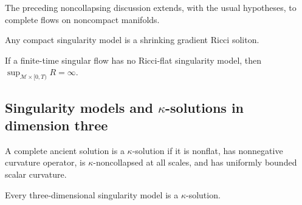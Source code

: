\begin{remark}
\label{rem:chow-iv-noncompact-extension}

The preceding noncollapsing discussion extends, with the usual hypotheses,
to complete flows on noncompact manifolds.
\end{remark}

\begin{theorem}
\label{thm:chow-iv-compact-singularity-models}

Any compact singularity model is a shrinking gradient Ricci soliton.
\end{theorem}

\begin{lemma}
\label{lem:chow-iv-bounded-scalar-criterion}

If a finite-time singular flow has no Ricci-flat singularity model, then
\(\sup_{\mathcal M\times[0,T)}R=\infty\).
\end{lemma}

\subsection{\texorpdfstring{Singularity models and \(\kappa\)-solutions in dimension three}{Singularity models and Kappa-solutions in dimension three}}

\begin{definition}
\label{def:chow-iv-kappa-solution}

A complete ancient solution is a \(\kappa\)-solution if it is nonflat, has
nonnegative curvature operator, is \(\kappa\)-noncollapsed at all scales, and
has uniformly bounded scalar curvature.
\end{definition}

\begin{theorem}
\label{thm:chow-iv-3d-models-kappa}


Every three-dimensional singularity model is a \(\kappa\)-solution.
\end{theorem}

